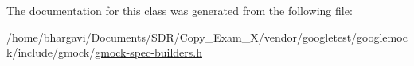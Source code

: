The documentation for this class was generated from the following file\+:\begin{DoxyCompactItemize}
\item 
/home/bhargavi/\+Documents/\+S\+D\+R/\+Copy\+\_\+\+Exam\+\_\+X/vendor/googletest/googlemock/include/gmock/\hyperlink{gmock-spec-builders_8h}{gmock-\/spec-\/builders.\+h}\end{DoxyCompactItemize}
